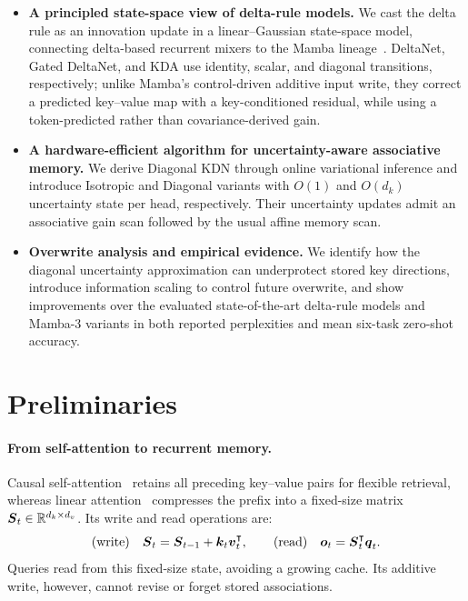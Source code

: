 \documentclass{article} %
\begin{document}
\begin{itemize}[leftmargin=1.4em,itemsep=3pt,topsep=2pt]
  \item \textbf{A principled state-space view of delta-rule models.} We cast the delta rule as an
  innovation update in a linear--Gaussian state-space model, connecting delta-based recurrent
  mixers to the Mamba lineage~\citep{gu2023mamba}. DeltaNet, Gated DeltaNet, and KDA use
  identity, scalar, and diagonal transitions, respectively; unlike Mamba's control-driven additive
  input write, they correct a predicted key--value map with a key-conditioned residual, while using
  a token-predicted rather than covariance-derived gain.
  \item \textbf{A hardware-efficient algorithm for uncertainty-aware associative memory.} We derive Diagonal KDN through online
  variational inference and introduce Isotropic and Diagonal variants with $O(1)$ and $O(d_k)$
  uncertainty state per head, respectively. Their uncertainty updates admit an associative gain
  scan followed by the usual affine memory scan.
  \item \textbf{Overwrite analysis and empirical evidence.} We identify how the diagonal
  uncertainty approximation can underprotect stored key directions, introduce information scaling to control future
  overwrite, and show improvements over the evaluated state-of-the-art delta-rule models and
  Mamba-3 variants in both reported perplexities and mean six-task zero-shot accuracy.
\end{itemize}

\section{Preliminaries}
\label{sec:preliminaries}

\paragraph{From self-attention to recurrent memory.}
Causal self-attention~\citep{vaswani2017attention} retains all preceding key--value pairs for
flexible retrieval, whereas linear attention~\citep{katharopoulos2020transformers} compresses the
prefix into a fixed-size matrix $\boldsymbol{S}_t\in\mathbb{R}^{d_k\times d_v}$. Its write and read operations are:
\begin{equation}
  \text{(write)}\quad \boldsymbol{S}_t=\boldsymbol{S}_{t-1}+\boldsymbol{k}_t\boldsymbol{v}_t^{\intercal},
  \qquad
  \text{(read)}\quad \boldsymbol{o}_t=\boldsymbol{S}_t^{\intercal}\boldsymbol{q}_t.
  \label{eq:linear-attention-main}
\end{equation}
Queries read from this fixed-size state, avoiding a growing cache. Its additive write, however,
cannot revise or forget stored associations.
\end{document}
